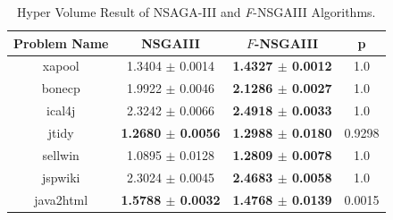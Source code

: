 \documentclass[letterpaper, 10 pt, conference]{ieeeconf}  %
\begin{document}
\begin{table}[!h]\label{table:result}


\begin{center}
\caption{Hyper Volume Result of NSAGA-III and \textit{F}-NSGAIII Algorithms.}
\begin{tabular}{ |c|c|c|c| } 
\hline Problem Name&	NSGAIII&	$F$-NSGAIII & p\\ \hline
xapool&	1.3404 $\pm$ 0.0014&	\textbf{1.4327 $\pm$ 0.0012} & 1.0\\ \hline
bonecp&	1.9922 $\pm$ 0.0046&	\textbf{2.1286 $\pm$ 0.0027} & 1.0\\ \hline
ical4j&	2.3242 $\pm$ 0.0066&	\textbf{2.4918 $\pm$ 0.0033} & 1.0\\ \hline
jtidy&	\textbf{1.2680 $\pm$ 0.0056}&	\textbf{1.2988 $\pm$ 0.0180} & 0.9298\\ \hline
sellwin&	1.0895 $\pm$ 0.0128&	\textbf{1.2809 $\pm$ 0.0078} & 1.0\\ \hline
jspwiki&	2.3024 $\pm$ 0.0045&	\textbf{2.4683 $\pm$ 0.0058} & 1.0\\ \hline
java2html&	\textbf{1.5788 $\pm$ 0.0032}&	\textbf{1.4768 $\pm$ 0.0139} & 0.0015\\ \hline




\end{tabular}
\end{center}

\end{table}
\end{document}
